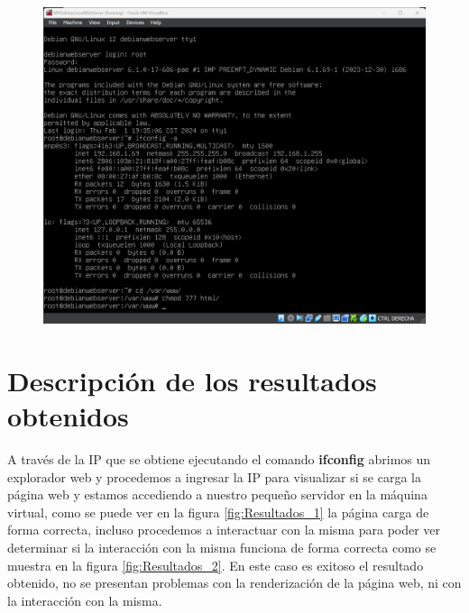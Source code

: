 \documentclass[12pt,a4paper]{article}
\begin{document}
\begin{itemize}
\begin{figure}[H]
    \centering
    \includegraphics[width=1\linewidth]{M3_Virtualización_y_Contenedores/Tarea_2_Máquina_Virtual_Local/reporte/figuras/6-2_Carga_Sitio_Web_en_MV.png}
    \label{fig:Cargado_sitio_web_2}
\end{figure}


\section{Descripción de los resultados obtenidos}

A través de la IP que se obtiene ejecutando el comando \textbf{ifconfig} abrimos un explorador web y procedemos a ingresar la IP para visualizar si se carga la página web y estamos accediendo a nuestro pequeño servidor en la máquina virtual, como se puede ver en la figura \ref{fig:Resultados_1} la página carga de forma correcta, incluso procedemos a interactuar con la misma para poder ver determinar si la interacción con la misma funciona de forma correcta como se muestra en la figura \ref{fig:Resultados_2}. En este caso es exitoso el resultado obtenido, no se presentan problemas con la renderización de la página web, ni con la interacción con la misma.


\end{itemize}
\end{document}
